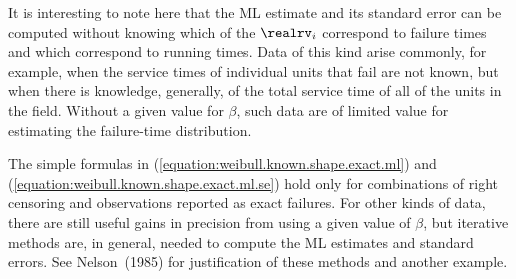 It is interesting to note here that the ML estimate and its standard
error can be computed without knowing which of the $\realrv_{i}$
correspond to failure times and which correspond to running times.
Data of this kind arise commonly, for example, when the service times
of individual units that fail are not known, but when there is knowledge, 
generally, of the total service time
of all of the units in the field. Without a given value for $\beta$,
such data are of limited value for estimating
the failure-time distribution.

The simple formulas in (\ref{equation:weibull.known.shape.exact.ml})
and (\ref{equation:weibull.known.shape.exact.ml.se}) hold only for
combinations of
right censoring and observations reported as exact failures.  For
other kinds of data, there are still useful gains in precision
from using a given value of $\beta$, but
iterative methods are, in general, needed to compute the ML estimates
and standard errors. See Nelson~(1985) for justification of these
methods and another example.


